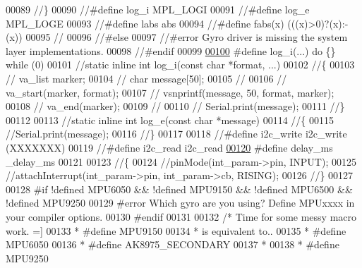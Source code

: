 \begin{DoxyCode}
00089 \textcolor{comment}{//\}}
00090 \textcolor{comment}{//#define log\_i       MPL\_LOGI}
00091 \textcolor{comment}{//#define log\_e       MPL\_LOGE}
00093 \textcolor{comment}{}\textcolor{comment}{//#define labs        abs}
00094 \textcolor{comment}{//#define fabs(x)     (((x)>0)?(x):-(x))}
00095 \textcolor{comment}{//}
00096 \textcolor{comment}{//#else}
00097 \textcolor{comment}{//#error  Gyro driver is missing the system layer implementations.}
00098 \textcolor{comment}{//#endif}
00099 
\hypertarget{inv__mpu_8c_source.tex_l00100}{}\hyperlink{inv__mpu_8c_a67fc07fa528d8e62dc7b88a847b563f5}{00100} \textcolor{preprocessor}{#define log\_i(...)     do \{\} while (0)}
00101 \textcolor{comment}{//static inline int log\_i(const char *format, ...)}
00102 \textcolor{comment}{//\{}
00103 \textcolor{comment}{//  va\_list     marker;}
00104 \textcolor{comment}{//  char message[50];}
00105 \textcolor{comment}{//}
00106 \textcolor{comment}{//  va\_start(marker, format);}
00107 \textcolor{comment}{//  vsnprintf(message, 50, format, marker);}
00108 \textcolor{comment}{//  va\_end(marker);}
00109 \textcolor{comment}{//}
00110 \textcolor{comment}{//  Serial.print(message);}
00111 \textcolor{comment}{//\}}
00112 
00113 \textcolor{comment}{//static inline int log\_e(const char *message)}
00114 \textcolor{comment}{//\{}
00115     \textcolor{comment}{//Serial.print(message);}
00116 \textcolor{comment}{//\}}
00117 
00118 \textcolor{comment}{//#define i2c\_write   i2c\_write                                                 (XXXXXXX)}
00119 \textcolor{comment}{//#define i2c\_read    i2c\_read}
\hypertarget{inv__mpu_8c_source.tex_l00120}{}\hyperlink{inv__mpu_8c_ae36aca5baf9b6b7d74992aef00686d67}{00120} \textcolor{preprocessor}{#define delay\_ms    \_delay\_ms}
00121 
00123 \textcolor{comment}{//\{}
00124     \textcolor{comment}{//pinMode(int\_param->pin, INPUT);}
00125     \textcolor{comment}{//attachInterrupt(int\_param->pin, int\_param->cb, RISING);}
00126 \textcolor{comment}{//\}}
00127 
00128 \textcolor{preprocessor}{#if !defined MPU6050 && !defined MPU9150 && !defined MPU6500 && !defined MPU9250}
00129 \textcolor{preprocessor}{#error  Which gyro are you using? Define MPUxxxx in your compiler options.}
00130 \textcolor{preprocessor}{#endif}
00131 
00132 \textcolor{comment}{/* Time for some messy macro work. =]}
00133 \textcolor{comment}{ * #define MPU9150}
00134 \textcolor{comment}{ * is equivalent to..}
00135 \textcolor{comment}{ * #define MPU6050}
00136 \textcolor{comment}{ * #define AK8975\_SECONDARY}
00137 \textcolor{comment}{ *}
00138 \textcolor{comment}{ * #define MPU9250}

\end{DoxyCode}
